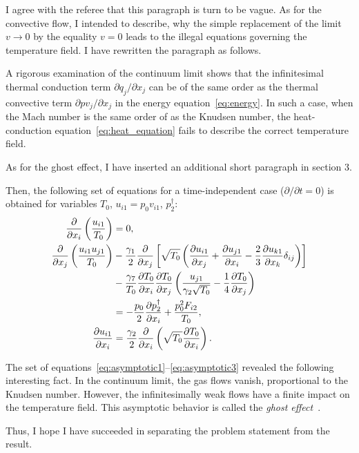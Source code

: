\documentclass{article}
\newcommand{\pder}[2][]{\frac{\partial#1}{\partial#2}}
\newcommand{\Pder}[2][]{\partial#1/\partial#2}
\def\asterism{\par\vspace{1em}{\centering\scalebox{1}{\bfseries *~*~*}\par}\vspace{.5em}\par}
\begin{document}
I agree with the referee that this paragraph is turn to be vague.
As for the convective flow, I intended to describe, why the simple replacement of the limit \(v\to0\)
by the equality \(v=0\) leads to the illegal equations governing the temperature field.
I have rewritten the paragraph as follows.
\begin{leftbar}
A rigorous examination of the continuum limit shows that the infinitesimal thermal conduction term \(\Pder[q_j]{x_j}\)
can be of the same order as the thermal convective term \(\Pder[pv_j]{x_j}\) in the energy equation~\eqref{eq:energy}.
In such a case, when the Mach number is the same order of as the Knudsen number,
the heat-conduction equation~\eqref{eq:heat_equation} fails to describe
the correct temperature field.
\end{leftbar}
As for the ghost effect, I have inserted an additional short paragraph in section 3.
\begin{leftbar}
Then, the following set of equations for a time-independent case (\(\Pder{t} = 0\))
is obtained for variables \(T_0\), \(u_{i1} = p_0v_{i1}\), \(p_2^\dag\):
\begin{align}
    \pder{x_i}\left(\frac{u_{i1}}{T_0}\right) &= 0, \label{eq:asymptotic1} \\
    \pder{x_j}\left(\frac{u_{i1}u_{j1}}{T_0}\right)
        &-\frac{\gamma_1}2\pder{x_j}\left[\sqrt{T_0}\left(
            \pder[u_{i1}]{x_j}+\pder[u_{j1}]{x_i}-\frac23\pder[u_{k1}]{x_k}\delta_{ij}\right
        )\right] \notag\\
        &- \frac{\gamma_7}{T_0}\pder[T_0]{x_i}\pder[T_0]{x_j}\left(\frac{u_{j1}}{\gamma_2\sqrt{T_0}} - \frac{1}4\pder[T_0]{x_j}\right) \notag\\
        &= -\frac{p_0}{2}\pder[p_2^\dag]{x_i} + \frac{p_0^2 F_{i2}}{T_0}, \label{eq:asymptotic2} \\
    \pder[u_{i1}]{x_i} &= \frac{\gamma_2}2\pder{x_i}\left(\sqrt{T_0}\pder[T_0]{x_i}\right). \label{eq:asymptotic3}
\end{align}
\asterism
The set of equations~\eqref{eq:asymptotic1}--\eqref{eq:asymptotic3} revealed the following interesting fact.
In the continuum limit, the gas flows vanish, proportional to the Knudsen number.
However, the infinitesimally weak flows have a finite impact on the temperature field.
This asymptotic behavior is called the \emph{ghost effect}~\cite{GhostEffect, Sone2002, Sone2007}.
\end{leftbar}
Thus, I hope I have succeeded in separating the problem statement from the result.
\end{document}
